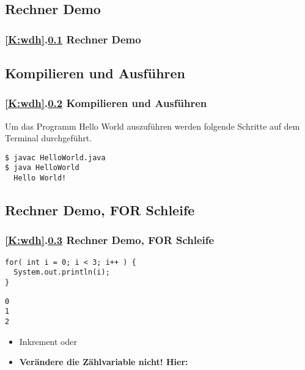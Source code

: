 \def\stitle{Rechner Demo}
\subsection{\stitle}\label{S:RechnerDemo0}
\begin{frame}[fragile]%
  \frametitle{\ref{K:wdh}.\ref{S:RechnerDemo0} \stitle}%


\end{frame}


\def\stitle{Kompilieren und Ausführen}
\subsection{\stitle}\label{S:CompilierenUexec}
\begin{frame}[fragile]%
  \frametitle{\ref{K:wdh}.\ref{S:CompilierenUexec} \stitle}%

Um das Programm Hello World auszuführen werden folgende Schritte auf dem Terminal durchgeführt.

\begin{lstlisting}[style=BASH]
$ javac HelloWorld.java
$ java HelloWorld
  Hello World!
\end{lstlisting}

\end{frame}


\def\stitle{Rechner Demo, FOR Schleife}
\subsection{\stitle}\label{S:RechnerDemo}
\begin{frame}[fragile]%
  \frametitle{\ref{K:wdh}.\ref{S:RechnerDemo} \stitle}%


\begin{lstlisting}[title={Beispiel Programm},style=java, frame=single]
for( int i = 0; i < 3; i++ ) {
  System.out.println(i);
}
\end{lstlisting}
\bigskip

\begin{lstlisting}[title=output,style=java, frame=single]
0
1
2
\end{lstlisting}
\hfill

\begin{itemize}
\item Inkrement  oder 
\item \textbf{Verändere die Zählvariable nicht! Hier: }
\end{itemize}
\end{frame}


